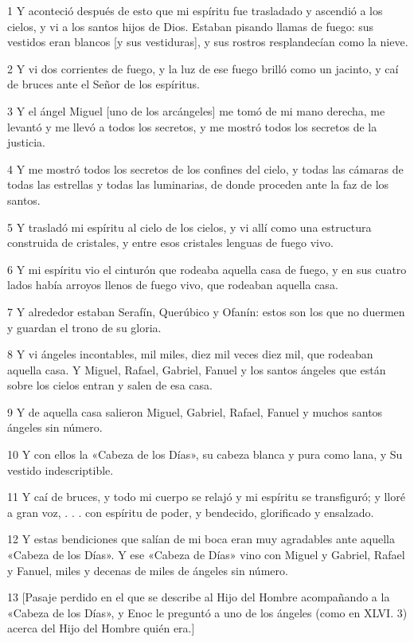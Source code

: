 \par 1 Y aconteció después de esto que mi espíritu fue trasladado y ascendió a los cielos, y vi a los santos hijos de Dios. Estaban pisando llamas de fuego: sus vestidos eran blancos [y sus vestiduras], y sus rostros resplandecían como la nieve.
\par 2 Y vi dos corrientes de fuego, y la luz de ese fuego brilló como un jacinto, y caí de bruces ante el Señor de los espíritus.
\par 3 Y el ángel Miguel [uno de los arcángeles] me tomó de mi mano derecha, me levantó y me llevó a todos los secretos, y me mostró todos los secretos de la justicia.
\par 4 Y me mostró todos los secretos de los confines del cielo, y todas las cámaras de todas las estrellas y todas las luminarias, de donde proceden ante la faz de los santos.
\par 5 Y trasladó mi espíritu al cielo de los cielos, y vi allí como una estructura construida de cristales, y entre esos cristales lenguas de fuego vivo.
\par 6 Y mi espíritu vio el cinturón que rodeaba aquella casa de fuego, y en sus cuatro lados había arroyos llenos de fuego vivo, que rodeaban aquella casa.
\par 7 Y alrededor estaban Serafín, Querúbico y Ofanín: estos son los que no duermen y guardan el trono de su gloria.
\par 8 Y vi ángeles incontables, mil miles, diez mil veces diez mil, que rodeaban aquella casa. Y Miguel, Rafael, Gabriel, Fanuel y los santos ángeles que están sobre los cielos entran y salen de esa casa.
\par 9 Y de aquella casa salieron Miguel, Gabriel, Rafael, Fanuel y muchos santos ángeles sin número.
\par 10 Y con ellos la «Cabeza de los Días», su cabeza blanca y pura como lana, y Su vestido indescriptible.
\par 11 Y caí de bruces, y todo mi cuerpo se relajó y mi espíritu se transfiguró; y lloré a gran voz, . . . con espíritu de poder, y bendecido, glorificado y ensalzado.
\par 12 Y estas bendiciones que salían de mi boca eran muy agradables ante aquella «Cabeza de los Días». Y ese «Cabeza de Días» vino con Miguel y Gabriel, Rafael y Fanuel, miles y decenas de miles de ángeles sin número.
\par 13 [Pasaje perdido en el que se describe al Hijo del Hombre acompañando a la «Cabeza de los Días», y Enoc le preguntó a uno de los ángeles (como en XLVI. 3) acerca del Hijo del Hombre quién era.]
